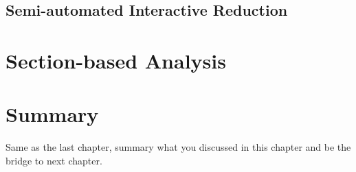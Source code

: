 \subsection{Semi-automated Interactive Reduction}

\section{Section-based Analysis}

\section{Summary}
Same as the last chapter, summary what you discussed in this chapter and
be the bridge to next chapter.
